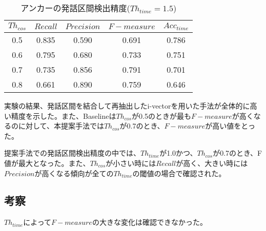 \begin{table}[H]
  \begin{center}
    \caption{アンカーの発話区間検出精度($Th_{time}=1.5$) \label{table:result_get_anchor15}}
    \begin{tabular}{|c||c|c|c|c|} \hline
      $Th_{cos}$ & $Recall$ & $Precision$ & $F-measure$ & $Acc_{time}$\\ \hline
0.5 & 0.835 & 0.590 & 0.691 & 0.786 \\ \hline
0.6 & 0.795 & 0.680 & 0.733 & 0.751 \\ \hline
0.7 & 0.735 & 0.856 & 0.791 & 0.701 \\ \hline
0.8 & 0.661 & 0.890 & 0.759 & 0.646 \\ \hline

    \end{tabular}
  \end{center}
\end{table}

実験の結果、発話区間を結合して再抽出したi-vectorを用いた手法が全体的に高い精度を示した。また、Baselineは$Th_{cos}$が0.5のときが最も$F-measure$が高くなるのに対して、本提案手法では$Th_{cos}$が0.7のとき、$F-measure$が高い値をとった。\par
提案手法での発話区間検出精度の中では、$Th_{time}$が1.0かつ、$Th_{cos}$が0.7のとき、F値が最大となった。また、$Th_{cos}$が小さい時には$Recall$が高く、大きい時には$Precision$が高くなる傾向が全ての$Th_{time}$の閾値の場合で確認された。

\subsection{考察}
$Th_{time}$によって$F-measure$の大きな変化は確認できなかった。